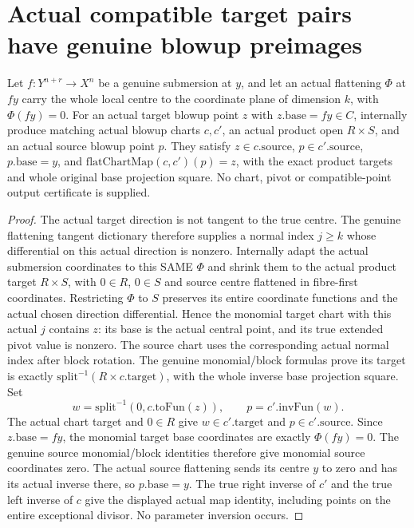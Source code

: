\section{Actual compatible target pairs have genuine blowup preimages}

\begin{lemma}
\label{hir:submersion-blowup-compatible-target-chart-point}
\leanok
{}
Let $f:Y^{n+r}\to X^n$ be a genuine submersion at $y$, and let an actual
flattening $\Phi$ at $fy$ carry the whole local centre to the coordinate plane
of dimension $k$, with $\Phi(fy)=0$. For an actual target blowup point $z$
with $z.\mathrm{base}=fy\in C$, internally produce matching actual blowup
charts $c,c'$, an actual product open $R\times S$, and an actual source
blowup point $p$. They satisfy $z\in c.\mathrm{source}$,
$p\in c'.\mathrm{source}$, $p.\mathrm{base}=y$, and
$\mathrm{flatChartMap}(c,c')(p)=z$, with the exact product targets and whole
original base projection square. No chart, pivot or compatible-point output
certificate is supplied.
\end{lemma}
\begin{proof}
The actual target direction is not tangent to the true centre. The genuine
flattening tangent dictionary therefore supplies a normal index $j\ge k$
whose differential on this actual direction is nonzero. Internally adapt
the actual submersion coordinates to this SAME $\Phi$ and shrink them to the
actual product target $R\times S$, with $0\in R$, $0\in S$ and source centre
flattened in fibre-first coordinates. Restricting $\Phi$ to $S$ preserves its
entire coordinate functions and the actual chosen direction differential.
Hence the monomial target chart with this actual $j$ contains $z$: its base
is the actual central point, and its true extended pivot value is nonzero.
The source chart uses the corresponding actual normal index after block
rotation. The genuine monomial/block formulas prove its target is exactly
$\mathrm{split}^{-1}(R\times c.\mathrm{target})$, with the whole inverse
base projection square. Set
\[w=\mathrm{split}^{-1}(0,c.\mathrm{toFun}(z)),\qquad p=c'.\mathrm{invFun}(w).\]
The actual chart target and $0\in R$ give $w\in c'.\mathrm{target}$ and
$p\in c'.\mathrm{source}$. Since $z.\mathrm{base}=fy$, the monomial target
base coordinates are exactly $\Phi(fy)=0$. The genuine source monomial/block
identities therefore give monomial source coordinates zero. The actual
source flattening sends its centre $y$ to zero and has its actual inverse
there, so $p.\mathrm{base}=y$. The true right inverse of $c'$ and the true
left inverse of $c$ give the displayed actual map identity, including points
on the entire exceptional divisor. No parameter inversion occurs.
\end{proof}

